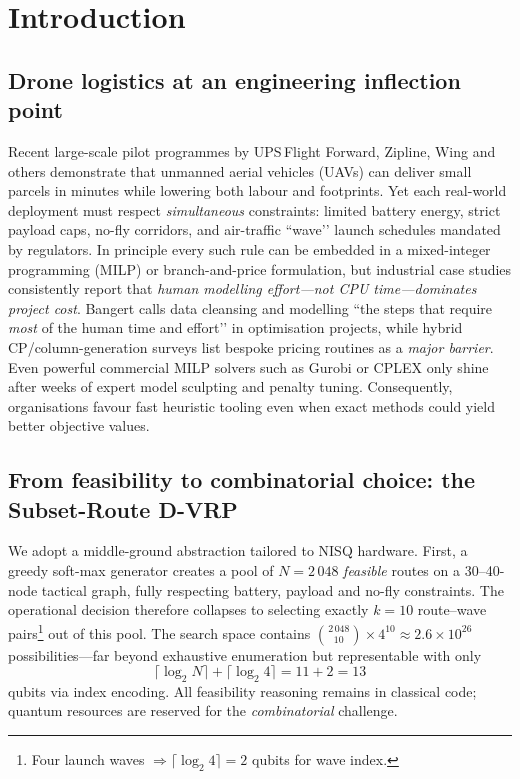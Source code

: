 \section{Introduction}

\subsection{Drone logistics at an engineering inflection point}

Recent large-scale pilot programmes by UPS\,Flight Forward, Zipline, Wing and others demonstrate that unmanned aerial vehicles (UAVs) can deliver small parcels in minutes while lowering both labour and  footprints.\cite{murray2020survey}  
Yet each real-world deployment must respect \emph{simultaneous} constraints: limited battery energy, strict payload caps, no-fly corridors, and air-traffic ``wave’’ launch schedules mandated by regulators.  
In principle every such rule can be embedded in a mixed-integer programming (MILP) or branch-and-price formulation, but industrial case studies consistently report that \emph{human modelling effort---not CPU time---dominates project cost}.  
Bangert calls data cleansing and modelling ``the steps that require \emph{most} of the human time and effort’’ in optimisation projects\cite{bangert2012industrial}, while hybrid CP/column-generation surveys list bespoke pricing routines as a \emph{major barrier}\cite{rossi2006hcp}.  
Even powerful commercial MILP solvers such as Gurobi or CPLEX only shine after weeks of expert model sculpting and penalty tuning.
Consequently, organisations favour fast heuristic tooling even when exact methods could yield better objective values.

\subsection{From feasibility to combinatorial choice: the Subset-Route D-VRP}

We adopt a middle-ground abstraction tailored to NISQ hardware.  
First, a greedy soft-max generator creates a pool of $N=2\,048$ \emph{feasible} routes on a 30--40-node tactical graph, fully respecting battery, payload and no-fly constraints.  
The operational decision therefore collapses to selecting exactly $k = 10$ route--wave pairs\footnote{Four launch waves $\Rightarrow \lceil\log_2 4\rceil = 2$ qubits for wave index.} out of this pool.  
The search space contains ${2\,048 \choose 10}\times4^{10}\!\approx 2.6\times10^{26}$ possibilities---far beyond exhaustive enumeration but representable with only
%
\[
\lceil\log_2 N\rceil + \lceil\log_2 4\rceil = 11 + 2 = 13
\]
%
qubits via index encoding.  All feasibility reasoning remains in classical code; quantum resources are reserved for the \emph{combinatorial} challenge.

